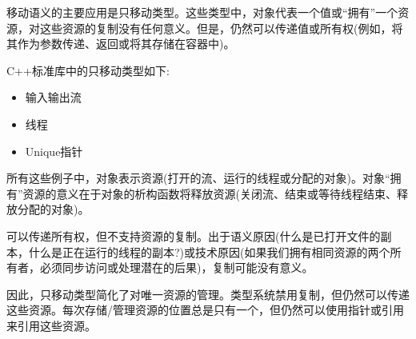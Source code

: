 移动语义的主要应用是只移动类型。这些类型中，对象代表一个值或“拥有”一个资源，对这些资源的复制没有任何意义。但是，仍然可以传递值或所有权(例如，将其作为参数传递、返回或将其存储在容器中)。\par

C++标准库中的只移动类型如下:\par

\begin{itemize}
	\item 输入输出流
	\item 线程
	\item Unique指针
\end{itemize}

所有这些例子中，对象表示资源(打开的流、运行的线程或分配的对象)。对象“拥有”资源的意义在于对象的析构函数将释放资源(关闭流、结束或等待线程结束、释放分配的对象)。\par

可以传递所有权，但不支持资源的复制。出于语义原因(什么是已打开文件的副本，什么是正在运行的线程的副本?)或技术原因(如果我们拥有相同资源的两个所有者，必须同步访问或处理潜在的后果)，复制可能没有意义。\par

因此，只移动类型简化了对唯一资源的管理。类型系统禁用复制，但仍然可以传递这些资源。每次存储/管理资源的位置总是只有一个，但仍然可以使用指针或引用来引用这些资源。\par
























































